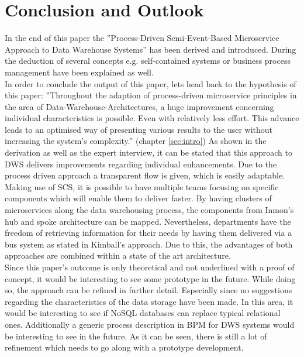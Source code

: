 \section{Conclusion and Outlook}
\label{sec:conclusion}
In the end of this paper the ''Process-Driven Semi-Event-Based Microservice Approach to Data Warehouse Systems'' has been derived and introduced. During the deduction of several concepts e.g. self-contained systems or business process management have been explained as well. \newline
\\
In order to conclude the output of this paper, lets head back to the hypothesis of this paper: ''Throughout the adaption of process-driven  microservice  principles  in  the  area  of  Data-Warehouse-Architectures,  a  huge improvement concerning individual characteristics is possible. Even with relatively less effort. This advance leads to an optimised way of presenting various results to the user without increasing the system's complexity.'' (chapter \ref{sec:intro})
As shown in the derivation as well as the expert interview, it can be stated that this approach to DWS delivers improvements regarding individual enhancements. Due to the process driven approach a transparent flow is given, which is easily adaptable. Making use of SCS, it is possible to have multiple teams focusing on specific components which will enable them to deliver faster. By having clusters of microservices along the data warehousing process, the components from Inmon's hub and spoke architecture can be mapped. Nevertheless, departments have the freedom of retrieving information for their needs by having them delivered via a bus system as stated in Kimball's approach.\newline
Due to this, the advantages of both approaches are combined within a state of the art architecture. \newline
\\
Since this paper's outcome is only theoretical and not underlined with a proof of concept, it would be interesting to see some prototype in the future. While doing so, the approach can be refined in further detail. Especially since no suggestions regarding the characteristics of the data storage have been made. In this area, it would be interesting to see if NoSQL databases can replace typical relational ones. Additionally a generic process description in BPM for DWS systems would be interesting to see in the future. As it can be seen, there is still a lot of refinement which needs to go along with a prototype development.
